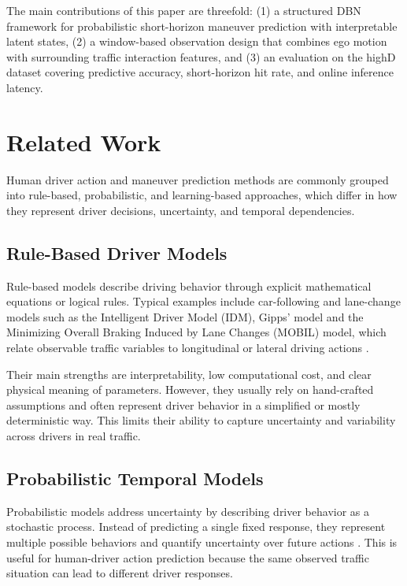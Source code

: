 \documentclass[upint,subscriptcorrection,varvw,hyphenate,balance,greek,russian,vietnamese,german]{asmeconf} %
\begin{document}
The main contributions of this paper are threefold: 
(1) a structured DBN framework for probabilistic short-horizon maneuver prediction with interpretable latent states, 
(2) a window-based observation design that combines ego motion with surrounding traffic interaction features, and 
(3) an evaluation on the highD dataset covering predictive accuracy, short-horizon hit rate, and online inference latency.


\section{Related Work}
Human driver action and maneuver prediction methods are commonly grouped into rule-based, probabilistic, and learning-based approaches, 
which differ in how they represent driver decisions, uncertainty, and temporal dependencies.  

\subsection{Rule-Based Driver Models}
Rule-based models describe driving behavior through explicit mathematical equations or logical rules. 
Typical examples include car-following and lane-change models such as the Intelligent Driver Model (IDM), Gipps' model and the Minimizing Overall Braking Induced by 
Lane Changes (MOBIL) model, 
which relate observable traffic variables to 
longitudinal or lateral driving actions \cite{PhysRevE.62.1805,Kesting2007GeneralLM,zhou2025,GIPPS1981105}. 

Their main strengths are interpretability, low computational cost, and clear physical meaning of parameters. 
However, they usually rely on hand-crafted assumptions and often represent driver behavior in a simplified or mostly deterministic way. 
This limits their ability to capture uncertainty and variability across drivers in real traffic. 

\subsection{Probabilistic Temporal Models}
Probabilistic models address uncertainty by describing driver behavior as a stochastic process. 
Instead of predicting a single fixed response, they represent multiple possible behaviors and quantify uncertainty over future 
actions \cite{wang2023probabilisticpredictionlongitudinaltrajectory}. 
This is useful for human-driver action prediction because the same observed traffic situation can lead to different driver responses.
\end{document}
